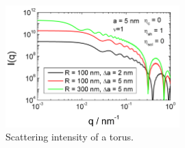 \begin{figure}[htb]
\begin{center}
\includegraphics[width=0.6\textwidth]{../images/form_factor/cylindrical_obj/Torus.png}
\end{center}
\caption{Scattering intensity of a torus. }
\label{fig:Torus}
\end{figure}





\clearpage
